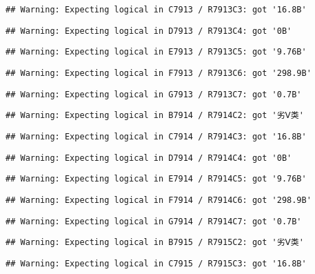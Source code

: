\documentclass[
]{article}
\begin{document}
\begin{verbatim}
## Warning: Expecting logical in C7913 / R7913C3: got '16.8B'
\end{verbatim}

\begin{verbatim}
## Warning: Expecting logical in D7913 / R7913C4: got '0B'
\end{verbatim}

\begin{verbatim}
## Warning: Expecting logical in E7913 / R7913C5: got '9.76B'
\end{verbatim}

\begin{verbatim}
## Warning: Expecting logical in F7913 / R7913C6: got '298.9B'
\end{verbatim}

\begin{verbatim}
## Warning: Expecting logical in G7913 / R7913C7: got '0.7B'
\end{verbatim}

\begin{verbatim}
## Warning: Expecting logical in B7914 / R7914C2: got '劣Ⅴ类'
\end{verbatim}

\begin{verbatim}
## Warning: Expecting logical in C7914 / R7914C3: got '16.8B'
\end{verbatim}

\begin{verbatim}
## Warning: Expecting logical in D7914 / R7914C4: got '0B'
\end{verbatim}

\begin{verbatim}
## Warning: Expecting logical in E7914 / R7914C5: got '9.76B'
\end{verbatim}

\begin{verbatim}
## Warning: Expecting logical in F7914 / R7914C6: got '298.9B'
\end{verbatim}

\begin{verbatim}
## Warning: Expecting logical in G7914 / R7914C7: got '0.7B'
\end{verbatim}

\begin{verbatim}
## Warning: Expecting logical in B7915 / R7915C2: got '劣Ⅴ类'
\end{verbatim}

\begin{verbatim}
## Warning: Expecting logical in C7915 / R7915C3: got '16.8B'
\end{verbatim}
\end{document}
